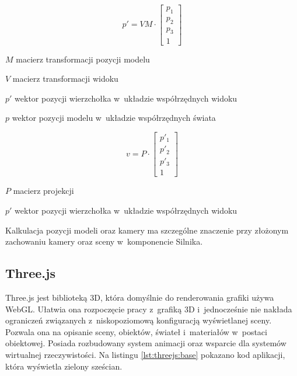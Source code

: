 \begin{equation}
    \label{eq:MV}
    p' = VM \cdot \begin{bmatrix}
        p_{1} \\
        p_{2} \\
        p_{3} \\ 
        1
      \end{bmatrix}
\end{equation}
\begin{eqexpl}[25mm]
    \item{$M$} macierz transformacji pozycji modelu
    \item{$V$} macierz transformacji widoku
    \item{$p'$} wektor pozycji wierzchołka w~układzie współrzędnych widoku
    \item{$p$} wektor pozycji modelu w~układzie współrzędnych świata
\end{eqexpl}

\begin{equation}
\label{eq:MVP}
    v = P \cdot \begin{bmatrix}
        p'_{1} \\
        p'_{2} \\
        p'_{3} \\ 
        1
      \end{bmatrix}
\end{equation}
\begin{eqexpl}[25mm]
    \item{$P$} macierz projekcji
    \item{$p'$} wektor pozycji wierzchołka w~układzie współrzędnych widoku
\end{eqexpl}
\vspace{\baselineskip}
Kalkulacja pozycji modeli oraz kamery ma szczególne znaczenie przy złożonym zachowaniu kamery oraz sceny w~komponencie Silnika.

\subsection{Three.js}

Three.js\cite{threejs} jest biblioteką 3D, która domyślnie do renderowania grafiki używa WebGL. Ułatwia ona rozpoczęcie pracy z~grafiką 3D i~jednocześnie nie nakłada ograniczeń związanych z~niskopoziomową konfiguracją wyświetlanej sceny. Pozwala ona na opisanie sceny, obiektów, świateł i~materiałów w~postaci obiektowej. Posiada rozbudowany system animacji oraz wsparcie dla systemów wirtualnej rzeczywistości. Na listingu \ref{lst:threejs:base} pokazano kod aplikacji, która wyświetla zielony sześcian.

